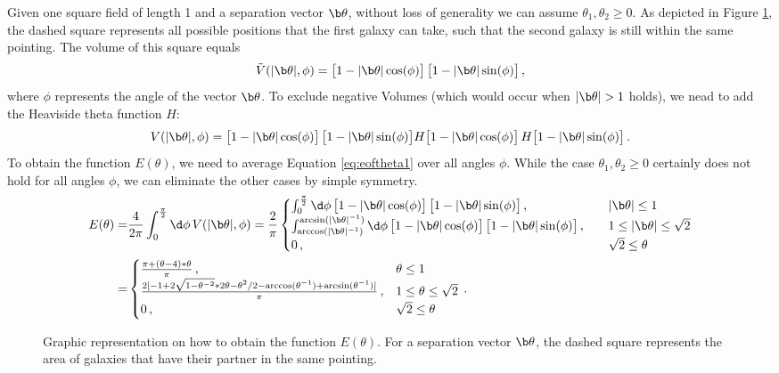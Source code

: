 Given one square field of length 1 and a separation vector $\b\theta$, without loss of generality we can assume $\theta_1,\theta_2\geq 0$. As depicted in Figure \ref{fig:explain_etheta}, the dashed square represents all possible positions that the first galaxy can take, such that the second galaxy is still within the same pointing. The volume of this square equals \begin{equation}
\tilde{V}(|\b\theta|,\phi)  = \big[1-|\b\theta|\cos(\phi)\big]\,\big[1-|\b\theta|\sin(\phi)\big]\, ,
\end{equation} where $\phi$ represents the angle of the vector $\b\theta$. To exclude negative Volumes (which would occur when $|\b\theta|>1$ holds), we nead to add the Heaviside theta function $H$:
\begin{equation}
V(|\b\theta|,\phi)  = \big[1-|\b\theta|\cos(\phi)\big]\,\big[1-|\b\theta|\sin(\phi)\big] H\big[1-|\b\theta|\cos(\phi)\big]\,H\big[1-|\b\theta|\sin(\phi)\big]\, .
\label{eq:eoftheta1}
\end{equation} 
To obtain the function $E(\theta)$, we need to average Equation \eqref{eq:eoftheta1} over all angles $\phi$. While the case $\theta_1,\theta_2\geq 0$ certainly does not hold for all angles $\phi$, we can eliminate the other cases by simple symmetry.
\begin{align}
E(\theta) = & \frac{4}{2\pi}\int_0^{\frac{\pi}{2}}\d\phi\, V(|\b\theta|,\phi) = \frac{2}{\pi}\begin{cases}
\int_0^{\frac{\pi}{2}} \d\phi\, \big[1-|\b\theta|\cos(\phi)\big]\,\big[1-|\b\theta|\sin(\phi)\big]\, , & |\b\theta|\leq 1 \\
\int_{\arccos(|\b\theta|^{-1})}^{\arcsin(|\b\theta|^{-1})} \d\phi\, \big[1-|\b\theta|\cos(\phi)\big]\,\big[1-|\b\theta|\sin(\phi)\big]\, , \quad & 1\leq |\b\theta| \leq \sqrt{2} \\
0\, , & \sqrt{2}\leq\theta
\end{cases} \nonumber\\
 = & \begin{cases}
\frac{\pi + (\theta-4)*\theta}{\pi}\, , & \theta \leq 1 \\
\frac{2[-1+2\sqrt{1-\theta^{-2}}*2\theta - \theta^2/2 - \arccos(\theta^{-1}) + \arcsin(\theta^{-1})]}{\pi}\, , & 1\leq \theta \leq \sqrt{2} \\
0\, , & \sqrt{2}\leq \theta
\end{cases}\, .
\end{align}
\begin{figure}
    \centering
    \def\svgwidth{200pt}    
      
    \caption{Graphic representation on how to obtain the function $E(\theta)$. For a separation vector $\b\theta$, the dashed square represents the area of galaxies that have their partner in the same pointing.}
    \label{fig:explain_etheta}
\end{figure}
